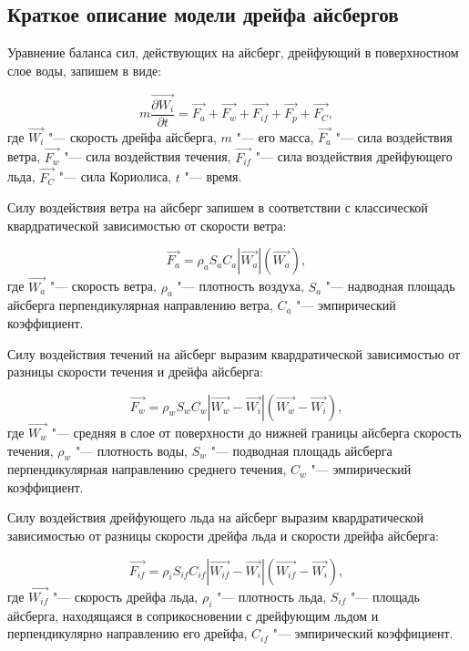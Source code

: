 \subsection{Краткое описание модели дрейфа айсбергов} \label{subsect4_1_1}

Уравнение баланса сил, действующих на айсберг, дрейфующий в поверхностном слое воды, запишем в виде:

\begin{equation}
\label{eq:equation4_1}
m{\frac{\vec{\partial W_i}}{\partial t}} = \vec{F_a}+\vec{F_w}+\vec{F_{if}}+\vec{F_p}+\vec{F_C},
\end{equation}
где $\vec{W_i}$ "--- скорость дрейфа айсберга, $m$ "--- его масса, $\vec{F_a}$ "--- сила воздействия ветра, $\vec{F_w}$ "--- сила воздействия течения, $\vec{F_{if}}$ "--- сила воздействия дрейфующего льда, $\vec{F_C}$ "--- сила Кориолиса, $t$ "--- время.

Силу воздействия ветра на айсберг запишем в соответствии с классической квардратической зависимостью от скорости ветра:

\begin{equation}
\label{eq:equation4_2}
\vec{F_a} = \rho_{a}S_{a}C_{a}\left|{\vec{W_a}}\right|\left(\vec{W_a}\right),
\end{equation}
где $\vec{W_a}$ "--- скорость ветра, $\rho_{a}$ "--- плотность воздуха, $S_{a}$ "--- надводная площадь айсберга перпендикулярная направлению ветра, $C_{a}$ "---  эмпирический коэффициент.

Силу воздействия течений на айсберг выразим квардратической зависимостью от разницы скорости течения и дрейфа айсберга:

\begin{equation}
\label{eq:equation4_3}
\vec{F_w} = \rho_{w}S_{w}C_{w}\left|{\vec{W_w}-\vec{W_i}}\right|\left({\vec{W_w}-\vec{W_i}}\right),
\end{equation}
где $\vec{W_w}$ "--- средняя в слое от поверхности до нижней границы айсберга скорость течения, $\rho_{w}$ "--- плотность воды, $S_{w}$ "--- подводная площадь айсберга перпендикулярная направлению среднего течения, $C_{w}$ "---  эмпирический коэффициент.

Силу воздействия дрейфующего льда на айсберг выразим квардратической зависимостью от разницы скорости дрейфа льда и скорости дрейфа айсберга:

\begin{equation}
\label{eq:equation4_4}
\vec{F_{if}} = \rho_{i}S_{if}C_{if}\left|{\vec{W_{if}}-\vec{W_i}}\right|\left({\vec{W_{if}}-\vec{W_i}}\right),
\end{equation}
где $\vec{W_{if}}$ "--- скорость дрейфа льда, $\rho_{i}$ "--- плотность льда, $S_{if}$ "--- площадь айсберга, находящаяся в соприкосновении с дрейфующим льдом и перпендикулярно направлению его дрейфа, $C_{if}$ "---  эмпирический коэффициент.

